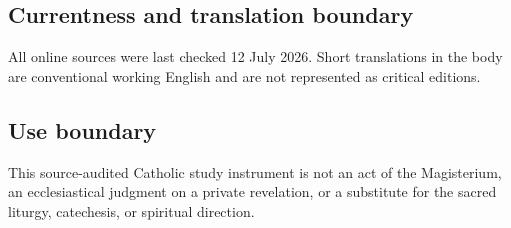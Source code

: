 {\subsection{Currentness and translation boundary}

All online sources were last checked 12 July 2026. Short translations in the body are conventional working English and are not represented as critical editions.

\subsection{Use boundary}

This source-audited Catholic study instrument is not an act of the Magisterium, an ecclesiastical judgment on a private revelation, or a substitute for the sacred liturgy, catechesis, or spiritual direction.
}
